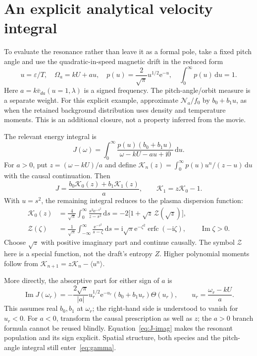 \documentclass[10pt,a4paper]{article}
\newcommand{\dd}{\mathrm{d}}
\newcommand{\ii}{\mathrm{i}}
\newcommand{\E}{\mathrm{e}}
\newcommand{\N}{\mathcal{N}}
\newcommand{\K}{\mathcal{K}}
\newcommand{\Zfun}{\mathcal{Z}}
\newcommand{\vd}{\bar v_{da}}
\DeclareMathOperator{\erfc}{erfc}
\begin{document}
\newpage
\section{An explicit analytical velocity integral}
To evaluate the resonance rather than leave it as a formal pole, take a fixed pitch angle and use the quadratic-in-speed magnetic drift in the reduced form
\begin{equation}
 u=\varepsilon/T,\quad \Omega_a=kU+au,\quad
 p(u)=\frac{2}{\sqrt\pi}u^{1/2}\E^{-u},\quad
 \int_0^\infty p(u)\,\dd u=1.
 \label{eq:maxwellian}
\end{equation}
Here $a=k\vd(u=1,\lambda)$ is a signed frequency. The pitch-angle/orbit measure is a separate weight. For this explicit example, approximate $\N_a/f_0$ by $b_0+b_1u$, as when the retained background distribution uses density and temperature moments. This is an additional closure, not a property inferred from the movie.

The relevant energy integral is
\begin{equation}
 J(\omega)=\int_0^\infty
 \frac{p(u)(b_0+b_1u)}{\omega-kU-au+\ii0}\,\dd u.
 \label{eq:J}
\end{equation}
For $a>0$, put $z=(\omega-kU)/a$ and define
$\K_n(z)=\int_0^\infty p(u)u^n/(z-u)\,\dd u$ with the causal continuation. Then
\begin{equation}
 J=\frac{b_0\K_0(z)+b_1\K_1(z)}{a},\qquad
 \K_1=z\K_0-1.
 \label{eq:J-reduced}
\end{equation}
With $u=s^2$, the remaining integral reduces to the plasma dispersion function:
\begin{align}
 \K_0(z)&=\frac{4}{\sqrt\pi}\int_0^\infty
 \frac{s^2\E^{-s^2}}{z-s^2}\,\dd s
 =-2\bigl[1+\sqrt z\,\Zfun(\sqrt z)\bigr],\label{eq:K0}\\
 \Zfun(\zeta)&=\frac{1}{\sqrt\pi}\int_{-\infty}^{\infty}
 \frac{\E^{-s^2}}{s-\zeta}\,\dd s
 =\ii\sqrt\pi\E^{-\zeta^2}\erfc(-\ii\zeta),\qquad
 \operatorname{Im}\zeta>0.\label{eq:plasma-function}
\end{align}
Choose $\sqrt z$ with positive imaginary part and continue causally. The symbol $\Zfun$ here is a special function, not the draft's entropy $Z$. Higher polynomial moments follow from
$\K_{n+1}=z\K_n-\langle u^n\rangle$.

More directly, the absorptive part for either sign of $a$ is
\begin{equation}
 \operatorname{Im}J(\omega_r)
 =-\frac{2\sqrt\pi}{|a|}u_r^{1/2}\E^{-u_r}(b_0+b_1u_r)\Theta(u_r),
 \qquad u_r=\frac{\omega_r-kU}{a}.
 \label{eq:J-imag}
\end{equation}
This assumes real $b_0,b_1$ at $\omega_r$; the right-hand side is understood to vanish for $u_r<0$. For $a<0$, transform the causal prescription as well as $z$; the $a>0$ branch formula cannot be reused blindly. Equation~\eqref{eq:J-imag} makes the resonant population and its sign explicit. Spatial structure, both species and the pitch-angle integral still enter~\eqref{eq:gamma}.
\end{document}

